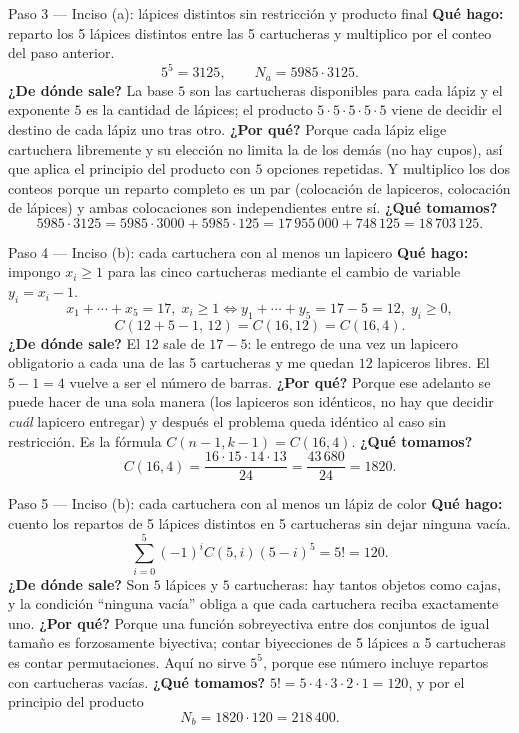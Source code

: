 \documentclass[11pt]{article}
\begin{document}
\begin{paso}{Paso 3 --- Inciso (a): lápices distintos sin restricción y producto final}
\textbf{Qué hago:} reparto los 5 lápices distintos entre las 5 cartucheras y multiplico por el conteo del paso anterior.
\[
5^5=3125,\qquad N_a=5985\cdot 3125 .
\]
\textbf{¿De dónde sale?} La base $5$ son las cartucheras disponibles para cada lápiz y el exponente $5$ es la cantidad de lápices; el producto $5\cdot5\cdot5\cdot5\cdot5$ viene de decidir el destino de cada lápiz uno tras otro.
\textbf{¿Por qué?} Porque cada lápiz elige cartuchera libremente y su elección no limita la de los demás (no hay cupos), así que aplica el principio del producto con $5$ opciones repetidas. Y multiplico los dos conteos porque un reparto completo es un par (colocación de lapiceros, colocación de lápices) y ambas colocaciones son independientes entre sí.
\textbf{¿Qué tomamos?}
\[
5985\cdot 3125=5985\cdot 3000+5985\cdot 125=17\,955\,000+748\,125=18\,703\,125 .
\]
\end{paso}

\begin{paso}{Paso 4 --- Inciso (b): cada cartuchera con al menos un lapicero}
\textbf{Qué hago:} impongo $x_i\ge 1$ para las cinco cartucheras mediante el cambio de variable $y_i=x_i-1$.
\[
x_1+\cdots+x_5=17,\;x_i\ge1
\iff y_1+\cdots+y_5=17-5=12,\;y_i\ge 0,
\]
\[
C(12+5-1,\,12)=C(16,12)=C(16,4).
\]
\textbf{¿De dónde sale?} El $12$ sale de $17-5$: le entrego de una vez un lapicero obligatorio a cada una de las 5 cartucheras y me quedan $12$ lapiceros libres. El $5-1=4$ vuelve a ser el número de barras.
\textbf{¿Por qué?} Porque ese adelanto se puede hacer de una sola manera (los lapiceros son idénticos, no hay que decidir \emph{cuál} lapicero entregar) y después el problema queda idéntico al caso sin restricción. Es la fórmula $C(n-1,k-1)=C(16,4)$.
\textbf{¿Qué tomamos?}
\[
C(16,4)=\frac{16\cdot 15\cdot 14\cdot 13}{24}=\frac{43\,680}{24}=1820 .
\]
\end{paso}

\begin{paso}{Paso 5 --- Inciso (b): cada cartuchera con al menos un lápiz de color}
\textbf{Qué hago:} cuento los repartos de 5 lápices distintos en 5 cartucheras sin dejar ninguna vacía.
\[
\sum_{i=0}^{5}(-1)^iC(5,i)(5-i)^5=5!=120 .
\]
\textbf{¿De dónde sale?} Son $5$ lápices y $5$ cartucheras: hay tantos objetos como cajas, y la condición ``ninguna vacía'' obliga a que cada cartuchera reciba exactamente uno.
\textbf{¿Por qué?} Porque una función sobreyectiva entre dos conjuntos de igual tamaño es forzosamente biyectiva; contar biyecciones de 5 lápices a 5 cartucheras es contar permutaciones. Aquí no sirve $5^5$, porque ese número incluye repartos con cartucheras vacías.
\textbf{¿Qué tomamos?} $5!=5\cdot4\cdot3\cdot2\cdot1=120$, y por el principio del producto
\[
N_b=1820\cdot 120=218\,400 .
\]
\end{paso}
\end{document}
